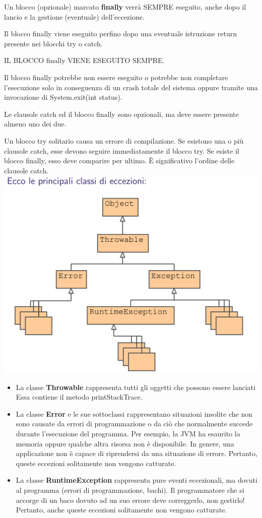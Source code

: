 \documentclass[10pt]{article}
\begin{document}
Un blocco (opzionale) marcato \textbf{finally} verrà SEMPRE eseguito, anche dopo il
lancio e la gestione (eventuale) dell’eccezione.

Il blocco finally viene eseguito perfino dopo una eventuale istruzione return
presente nei blocchi try o catch.

IL BLOCCO finally VIENE ESEGUITO SEMPRE.

Il blocco finally potrebbe non essere eseguito o potrebbe non completare
l’esecuzione solo in conseguenza di un crash totale del sistema oppure tramite
una invocazione di System.exit(int status).

Le clausole catch ed il blocco finally sono opzionali, ma deve
essere presente almeno uno dei due.

Un blocco try solitario causa un errore di compilazione.
Se esistono una o più clausole catch, esse devono seguire
immediatamente il blocco try.
Se esiste il blocco finally, esso deve comparire per ultimo.
È significativo l’ordine delle clausole catch.\\
\includegraphics[scale=0.5]{Immagini/eccezioni.png}
\begin{itemize}
    \item La classe \textbf{Throwable} rappresenta tutti gli oggetti che possono
essere lanciati Essa contiene il metodo printStackTrace.
\item La classe \textbf{Error} e le sue sottoclassi rappresentano situazioni
insolite che non sono causate da errori di programmazione o da
ciò che normalmente succede durante l’esecuzione del
programma. Per esempio, la JVM ha esaurito la memoria oppure
qualche altra risorsa non è disponibile.
In genere, una applicazione non è capace di riprendersi da una
situazione di errore. Pertanto, queste eccezioni solitamente non
vengono catturate.
\item La classe \textbf{RuntimeException} rappresenta pure eventi
eccezionali, ma dovuti al programma (errori di programmazione,
bachi). Il programmatore che si accorge di un baco dovuto ad un
suo errore deve correggerlo, non gestirlo! Pertanto, anche queste
eccezioni solitamente non vengono catturate.

\end{itemize}
\end{document}
